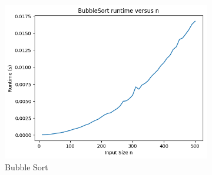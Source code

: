 \documentclass{article}
\begin{document}
\begin{figure}[H]
	\begin{subfigure}{.3\textwidth}
		\includegraphics[width=\textwidth]{../results/normal/BubbleSort.png}
		\caption{Bubble Sort}
	\end{subfigure}
	\caption*{}
\end{figure}
\end{document}
